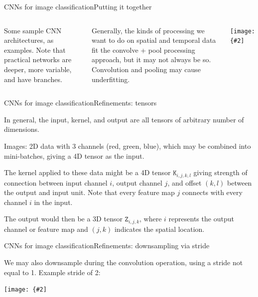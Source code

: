 \documentclass{beamer}
\newcommand{\mat}[1]{\mathtt{#1}}
\newcommand{\myfig}[3]{\centerline{\texttt{[image: \{\#2]}}}
\begin{document}
\begin{frame}{CNNs for image classification}{Putting it together}

  \begin{columns}

    \column{2in}

    Some sample CNN architectures, as examples.  Note that practical
networks are deeper, more variable, and have branches.

\medskip

Generally, the kinds of processing we want to do on spatial and temporal
data fit the convolve + pool processing approach, but it may not always
be so. Convolution and pooling may cause \alert{underfitting}.

\column{2.5in}

\myfig{2in}{goodfellow-fig9-11}{Goodfellow et al. (2016), Figure 9.11}

  \end{columns}
  
\end{frame}


\begin{frame}{CNNs for image classification}{Refinements: tensors}

In general, the input, kernel, and output are all tensors of arbitrary
number of dimensions.

\medskip

Images: 2D data with 3 channels (red, green, blue), which may be combined
into mini-batches, giving a 4D tensor as the input.

\medskip

The kernel applied to these data might be a 4D tensor $\mat{K}_{i,j,k,l}$ giving
strength of connection between input channel $i$, output channel $j$, and
offset $(k,l)$ between the output and input unit.  Note that every feature
map $j$ connects with \alert{every} channel $i$ in the input.

\medskip

The output would then be a 3D tensor $\mat{Z}_{i,j,k}$, where $i$ represents
the output channel or feature map and $(j,k)$ indicates the spatial location.

\end{frame}


\begin{frame}{CNNs for image classification}{Refinements: downsampling via stride}

We may also \alert{downsample} during the convolution operation, using
a stride not equal to 1. Example stride of 2:

\myfig{2in}{goodfellow-fig9-12}{Goodfellow et al. (2016), Figure 9.12}

\end{frame}
\end{document}
